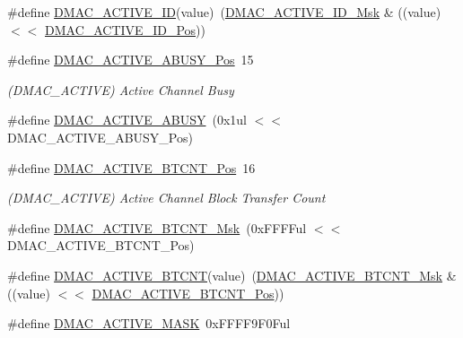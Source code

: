 \begin{DoxyCompactItemize}
\item 
\#define \mbox{\hyperlink{group___s_a_m_d21___d_m_a_c_gacee8d0d816564b871982d136dffa1aba}{D\+M\+A\+C\+\_\+\+A\+C\+T\+I\+V\+E\+\_\+\+ID}}(value)~(\mbox{\hyperlink{group___s_a_m_d21___d_m_a_c_gaa2b4886798972a76de8e342202c0209f}{D\+M\+A\+C\+\_\+\+A\+C\+T\+I\+V\+E\+\_\+\+I\+D\+\_\+\+Msk}} \& ((value) $<$$<$ \mbox{\hyperlink{group___s_a_m_d21___d_m_a_c_ga4d1a17504745f9621931fd0d0938ba4f}{D\+M\+A\+C\+\_\+\+A\+C\+T\+I\+V\+E\+\_\+\+I\+D\+\_\+\+Pos}}))
\item 
\#define \mbox{\hyperlink{group___s_a_m_d21___d_m_a_c_gacba9c3ae57a373db30cb2a23da32afc2}{D\+M\+A\+C\+\_\+\+A\+C\+T\+I\+V\+E\+\_\+\+A\+B\+U\+S\+Y\+\_\+\+Pos}}~15
\begin{DoxyCompactList}\small\item\em (D\+M\+A\+C\+\_\+\+A\+C\+T\+I\+VE) Active Channel Busy \end{DoxyCompactList}\item 
\#define \mbox{\hyperlink{group___s_a_m_d21___d_m_a_c_gacf7b57bf2c4f5afc1078240c4f80dd0d}{D\+M\+A\+C\+\_\+\+A\+C\+T\+I\+V\+E\+\_\+\+A\+B\+U\+SY}}~(0x1ul $<$$<$ D\+M\+A\+C\+\_\+\+A\+C\+T\+I\+V\+E\+\_\+\+A\+B\+U\+S\+Y\+\_\+\+Pos)
\item 
\#define \mbox{\hyperlink{group___s_a_m_d21___d_m_a_c_ga56eec24c6439c5c97c6647fefce53b2c}{D\+M\+A\+C\+\_\+\+A\+C\+T\+I\+V\+E\+\_\+\+B\+T\+C\+N\+T\+\_\+\+Pos}}~16
\begin{DoxyCompactList}\small\item\em (D\+M\+A\+C\+\_\+\+A\+C\+T\+I\+VE) Active Channel Block Transfer Count \end{DoxyCompactList}\item 
\#define \mbox{\hyperlink{group___s_a_m_d21___d_m_a_c_ga3488f20c938ac62e2263798c6e3d123f}{D\+M\+A\+C\+\_\+\+A\+C\+T\+I\+V\+E\+\_\+\+B\+T\+C\+N\+T\+\_\+\+Msk}}~(0x\+F\+F\+F\+Ful $<$$<$ D\+M\+A\+C\+\_\+\+A\+C\+T\+I\+V\+E\+\_\+\+B\+T\+C\+N\+T\+\_\+\+Pos)
\item 
\#define \mbox{\hyperlink{group___s_a_m_d21___d_m_a_c_ga1476f81f7dee445b1957238b97a75404}{D\+M\+A\+C\+\_\+\+A\+C\+T\+I\+V\+E\+\_\+\+B\+T\+C\+NT}}(value)~(\mbox{\hyperlink{group___s_a_m_d21___d_m_a_c_ga3488f20c938ac62e2263798c6e3d123f}{D\+M\+A\+C\+\_\+\+A\+C\+T\+I\+V\+E\+\_\+\+B\+T\+C\+N\+T\+\_\+\+Msk}} \& ((value) $<$$<$ \mbox{\hyperlink{group___s_a_m_d21___d_m_a_c_ga56eec24c6439c5c97c6647fefce53b2c}{D\+M\+A\+C\+\_\+\+A\+C\+T\+I\+V\+E\+\_\+\+B\+T\+C\+N\+T\+\_\+\+Pos}}))
\item 
\#define \mbox{\hyperlink{group___s_a_m_d21___d_m_a_c_ga7a4f22b2de6c00f878ac18c9240525e3}{D\+M\+A\+C\+\_\+\+A\+C\+T\+I\+V\+E\+\_\+\+M\+A\+SK}}~0x\+F\+F\+F\+F9\+F0\+Ful

\end{DoxyCompactItemize}

